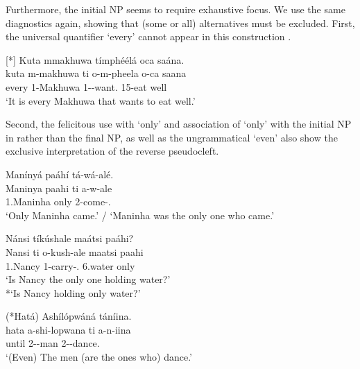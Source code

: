 \documentclass[output=paper]{langscibook}
\begin{document}
\z



Furthermore, the initial NP seems to require exhaustive focus. We use the same diagnostics again, showing that (some or all) alternatives must be excluded. First, the universal quantifier ‘every’ cannot appear in this construction .


\ea
[*]{
\label{bkm:Ref110413508}
Kuta mmakhuwa tímphéélá oca saána.\\
\gll
kuta  m-makhuwa  ti  o-m-pheela  o-ca  saana\\
every  1-Makhuwa  \COP{}  1-\PRS{}-want.\REL{}  15-eat  well\\
\glt
‘It is every Makhuwa that wants to eat well.’\\
}


\z

Second, the felicitous use with ‘only’  and association of ‘only’ with the initial NP in  rather than the final NP, as well as the ungrammatical ‘even’  also show the exclusive interpretation of the reverse pseudocleft.


\ea
\label{bkm:Ref96775954}
Manínyá paáhí tá-wá-alé.\\
\gll
Maninya  paahi  ti  a-w-ale\\
1.Maninha  only  \COP{}  2-come-\PFV{}.\REL{}\\
\glt
‘Only Maninha came.’ / ‘Maninha was the only one who came.’\\
 \citep[260]{vanderWal2009a}
\z

\ea
\label{bkm:Ref110415432}
Nánsi tíkúshale maátsi paáhi?\\
\gll
Nansi  ti  o-kush-ale  maatsi  paahi\\
1.Nancy  \COP{}  1-carry-\PFV{}.\REL{}  6.water  only\\
\glt
‘Is Nancy the only one holding water?’\\
*`Is Nancy holding only water?’


\z

\ea
\label{bkm:Ref96775962}
(*Hatá) Ashílópwáná táníina.\\
\gll
hata  a-shi-lopwana  ti  a-n-iina\\
until  2-\DIM{}-man  \COP{}  2-\PRS{}-dance.\REL{}\\
\glt
‘(Even) The men (are the ones who) dance.’\\
\end{document}
